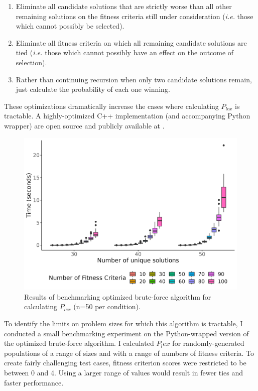 \documentclass[sigconf]{acmart}
\begin{document}
\begin{enumerate}
    \item Eliminate all candidate solutions that are strictly worse than all other remaining solutions on the fitness criteria still under consideration (\textit{i.e.} those which cannot possibly be selected).
    \item Eliminate all fitness criteria on which all remaining candidate solutions are tied (\textit{i.e.} those which cannot possibly have an effect on the outcome of selection).
    \item Rather than continuing recursion when only two candidate solutions remain, just calculate the probability of each one winning. 
\end{enumerate}

These optimizations dramatically increase the cases where calculating $P_{lex}$ is tractable. A highly-optimized C++ implementation (and accompanying Python wrapper) are open source and publicly available at \citep{ec_ecology_toolbox}.

\begin{figure}
    \centering
    \includegraphics[width=\linewidth]{figs/benchmark.png}
    \caption{Results of benchmarking optimized brute-force algorithm for calculating $P_{lex}$ (n=50 per condition).}
    \label{fig:benchmark}
\end{figure}

To identify the limits on problem sizes for which this algorithm is tractable, I conducted a small benchmarking experiment on the Python-wrapped version of the optimized brute-force algorithm. I calculated $P_lex$ for randomly-generated populations of a range of sizes and with a range of numbers of fitness criteria. To create fairly challenging test cases, fitness criterion scores were restricted to be between 0 and 4. Using a larger range of values would result in fewer ties and faster performance.
\end{document}
